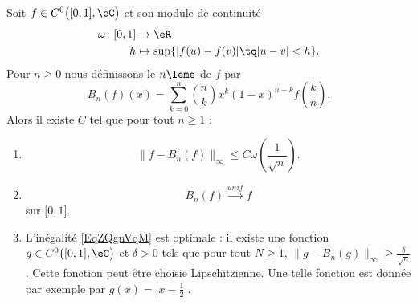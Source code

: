 \begin{theorem}    \label{ThoDJIvrty}
    Soit \( f\in C^0\big( \mathopen[ 0 , 1 \mathclose],\eC \big)\) et son module de continuité
    \begin{equation}
        \begin{aligned}
            \omega\colon \mathopen[ 0 , 1 \mathclose]&\to \eR \\
            h&\mapsto \sup\{ | f(u)-f(v) |\tq | u-v |< h \}. 
        \end{aligned}
    \end{equation}
    Pour \( n\geq 0\) nous définissons le \( n\Ieme\)  de \( f\) par
    \begin{equation}
        B_n(f)(x)=\sum_{k=0}^{n}\binom{ n }{ k }x^k(1-x)^{n-k}f\left( \frac{ k }{ n } \right).
    \end{equation}
    Alors il existe \( C\) tel que pour tout \( n\geq 1\) :
    \begin{enumerate}
        \item
            \begin{equation}        \label{EqZQgnVqM}
                \| f-B_n(f) \|_{\infty}\leq C\omega\left( \frac{1}{ \sqrt{n} } \right).
            \end{equation}
        \item
            \begin{equation}
                B_n(f)\stackrel{unif}{\longrightarrow}f
            \end{equation}
            sur \( \mathopen[ 0 , 1 \mathclose]\).
        \item
            L'inégalité \eqref{EqZQgnVqM} est optimale : il existe une fonction \( g\in C^{0}\big( \mathopen[ 0 , 1 \mathclose],\eC \big)\) et \( \delta>0\) tels que pour tout \( N\geq 1\), \( \| g-B_n(g) \|_{\infty}\geq\frac{ \delta }{ \sqrt{n} }\). Cette fonction peut être choisie Lipschitzienne. Une telle fonction est donnée par exemple par \( g(x)=| x-\frac{ 1 }{2} |\).
    \end{enumerate}
\end{theorem}

